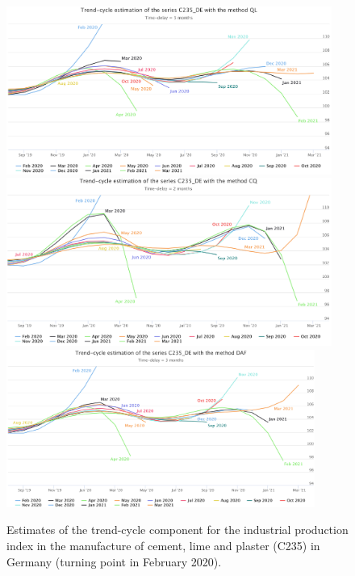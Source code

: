 \documentclass[fleqn,10pt]{latex/stylish_article} %
\newcommand\1{\mathds{1}}
\begin{document}
\begin{figure}\centering
\includegraphics[width=0.95\textwidth]{img/C235DE_ql} 
\includegraphics[width=0.95\textwidth]{img/C235DE_cq}
\includegraphics[width=0.9\textwidth]{img/C235DE_daf} 
\caption{Estimates of the trend-cycle component for the industrial production index in the manufacture of cement, lime and plaster (C235) in Germany (turning point in February 2020).}
\label{fig:C235DEp2}
\end{figure}
\end{document}
